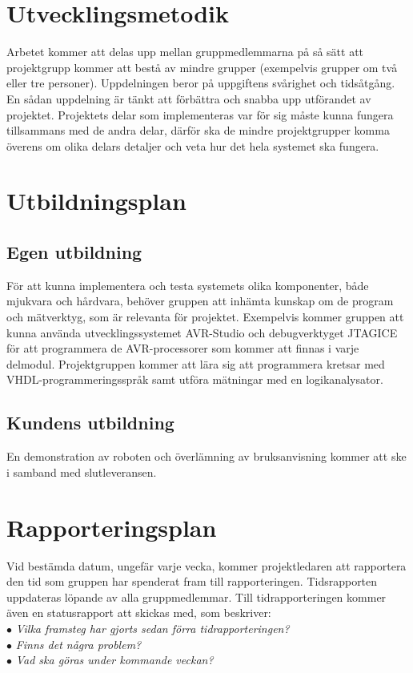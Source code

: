 \documentclass[11pt]{article}
\begin{document}
\begin{flushleft}
\begin{center}
\begin{longtable}{|p{.28\linewidth}|p{.1\linewidth}|p{.25\linewidth}|p{.19\linewidth}|p{.15\linewidth}|}
\end{longtable}
\end{center}
\pagebreak

\section{Utvecklingsmetodik}
Arbetet kommer att delas upp mellan gruppmedlemmarna på så sätt att projektgrupp kommer att bestå av mindre grupper (exempelvis grupper om två eller tre personer). Uppdelningen beror på uppgiftens svårighet och tidsåtgång. En sådan uppdelning är tänkt att förbättra och snabba upp utförandet av projektet. Projektets delar som implementeras var för sig måste kunna fungera tillsammans med de andra delar, därför ska de mindre projektgrupper komma överens om olika delars detaljer och veta hur det hela systemet ska fungera.




\section{Utbildningsplan}


\subsection{Egen utbildning}
För att kunna implementera och testa systemets olika komponenter, både mjukvara och hårdvara, behöver gruppen att inhämta kunskap om de program och mätverktyg, som är relevanta för projektet. Exempelvis kommer gruppen att kunna använda utvecklingssystemet AVR-Studio och debugverktyget JTAGICE för att programmera de AVR-processorer som kommer att finnas i varje delmodul. Projektgruppen kommer att lära sig att programmera kretsar med VHDL-programmeringsspråk samt utföra mätningar med en logikanalysator.

\subsection{Kundens utbildning}
En demonstration av roboten och överlämning av bruksanvisning kommer att ske i samband med slutleveransen.

\pagebreak

\section{Rapporteringsplan}
Vid bestämda datum, ungefär varje vecka, kommer projektledaren att rapportera den tid som gruppen har spenderat fram till rapporteringen. Tidsrapporten uppdateras löpande av alla gruppmedlemmar. Till tidrapporteringen kommer även en statusrapport att skickas med, som beskriver:\\
$\bullet$ \textit{Vilka framsteg har gjorts sedan förra tidrapporteringen?}\\
$\bullet$ \textit{Finns det några problem?}\\ 
$\bullet$ \textit{Vad ska göras under kommande veckan?}



\end{flushleft}
\end{document}
